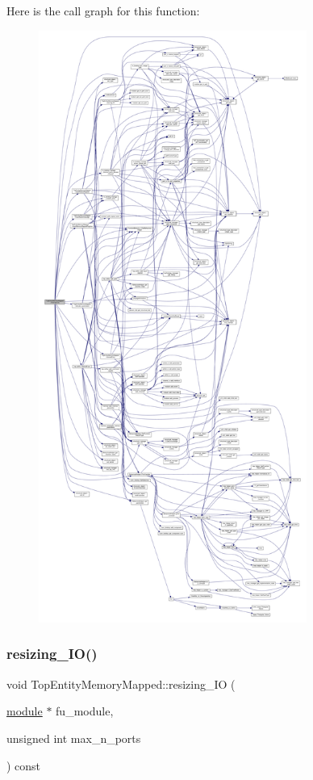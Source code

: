 Here is the call graph for this function\+:
\nopagebreak
\begin{figure}[H]
\begin{center}
\leavevmode
\includegraphics[height=550pt]{d1/db6/classTopEntityMemoryMapped_a33c5cbfe6f3cbd462a0f48e0a000674f_cgraph}
\end{center}
\end{figure}
\mbox{\label{classTopEntityMemoryMapped_a91b1fe9c30ef902d4857cc34d4270775}} 
\subsubsection{\texorpdfstring{resizing\+\_\+\+I\+O()}{resizing\_IO()}}
{\footnotesize\ttfamily void Top\+Entity\+Memory\+Mapped\+::resizing\+\_\+\+IO (\begin{DoxyParamCaption}\item[{\hyperlink{classmodule}{module} $\ast$}]{fu\+\_\+module,  }\item[{unsigned int}]{max\+\_\+n\+\_\+ports }\end{DoxyParamCaption}) const\hspace{0.3cm}{\ttfamily [private]}}



